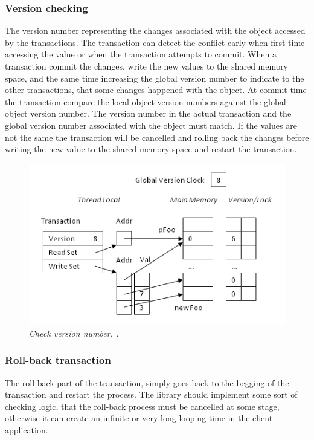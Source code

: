 \documentclass[12pt]{article}
\begin{document}
\subsubsection{Version checking}
The version number representing the changes associated with the object accessed by the transactions. The transaction can detect the conflict early when first time accessing the value or when the transaction attempts to commit. When a transaction commit the changes, write the new values to the shared memory space, and the same time increasing the global version number to indicate to the other transactions, that some changes happened with the object. At commit time the transaction compare the local object version numbers against the global object version number. The version number in the actual transaction and the global version number associated with the object must match. If the values are not the same the transaction will be cancelled and rolling back the changes before writing the new value to the shared memory space and restart the transaction.

\begin{figure}[h!]
\centering
\includegraphics[scale=0.4]{Pictures/version.png}
\caption{\textit{\color{gray}Check version number. \cite{Bartosz}.}}
\end{figure}


\subsubsection{Roll-back transaction}
The roll-back part of the transaction, simply goes back to the begging of the transaction and restart the process. The library should implement some sort of checking logic, that the roll-back process must be cancelled at some stage, otherwise it can create an infinite or very long looping time in the client application.
\end{document}
